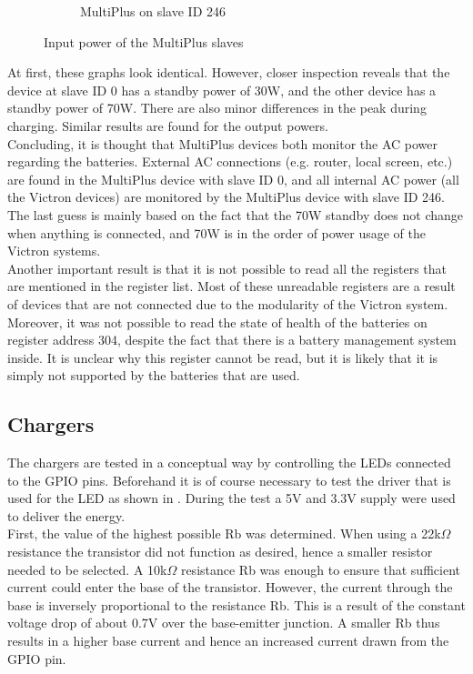 \begin{figure}
\begin{subfigure}{.5\textwidth}
  \caption{MultiPlus on slave ID 246}
  \label{fig:MultiPlus_input_70W}
\end{subfigure}
\caption{Input power of the MultiPlus slaves}
\label{fig:MultiPlus_inputs}
\end{figure}

At first, these graphs look identical. However, closer inspection reveals that the device at slave ID 0 has a standby power of 30W, and the other device has a standby power of 70W. There are also minor differences in the peak during charging. Similar results are found for the output powers.\\

Concluding, it is thought that MultiPlus devices both monitor the AC power regarding the batteries. External AC connections (e.g. router, local screen, etc.) are found in the MultiPlus device with slave ID 0, and all internal AC power (all the Victron devices) are monitored by the MultiPlus device with slave ID 246. The last guess is mainly based on the fact that the 70W standby does not change when anything is connected, and 70W is in the order of power usage of the Victron systems.\\

Another important result is that it is not possible to read all the registers that are mentioned in the register list. Most of these unreadable registers are a result of devices that are not connected due to the modularity of the Victron system. Moreover, it was not possible to read the state of health of the batteries on register address 304, despite the fact that there is a battery management system inside. It is unclear why this register cannot be read, but it is likely that it is simply not supported by the batteries that are used.

\subsection{Chargers}
The chargers are tested in a conceptual way by controlling the LEDs connected to the GPIO pins. Beforehand it is of course necessary to test the driver that is used for the LED as shown in . During the test a 5V and 3.3V supply were used to deliver the energy.\\

First, the value of the highest possible Rb was determined. When using a 22k$\Omega$ resistance the transistor did not function as desired, hence a smaller resistor needed to be selected. A 10k$\Omega$ resistance Rb was enough to ensure that sufficient current could enter the base of the transistor. However, the current through the base is inversely proportional to the resistance Rb. This is a result of the constant voltage drop of about 0.7V over the base-emitter junction. A smaller Rb thus results in a higher base current and hence an increased current drawn from the GPIO pin.\\

